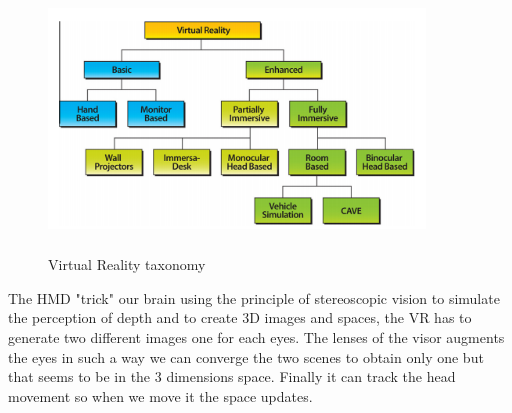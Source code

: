 \begin{figure}[H]
\centering
\includegraphics[width=10cm, height=7cm]{immagini/vrtaxonomy.png}
\caption{Virtual Reality taxonomy}\label{fig:vrtaxonomy}
\end{figure}
The HMD "trick" our brain using the principle of stereoscopic vision to simulate the perception of depth and to create 3D images and spaces, the VR has to generate two different images one for each eyes. The lenses of the visor augments the eyes in such a way we can converge the two scenes to obtain only one but that seems to be in the 3 dimensions space. Finally it can track the head movement so when we move it the space updates. 
